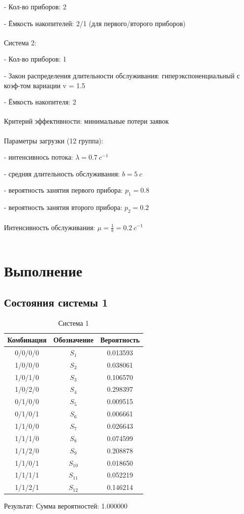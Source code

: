 \documentclass{article}
\begin{document}
- Кол-во приборов: 2

- Ёмкость накопителей: 2/1 (для первого/второго приборов)
\\ \\
Система 2: 

- Кол-во приборов: 1

- Закон распределения длительности обслуживания: гиперэкспоненциальный с коэф-том вариации v = 1.5

- Ёмкость накопителя: 2
\\ \\
Критерий эффективности: минимальные потери заявок
\\ \\
Параметры загрузки (12 группа):

- интенсивнось потока: $\lambda = 0.7 \ c^{-1}$

- средняя длительность обслуживания: $b = 5\ c$

- вероятность занятия первого прибора: $p_1 = 0.8$

- вероятность занятия второго прибора: $p_2 = 0.2$
\\ \\
Интенсивность обслуживания: $\mu = \frac{1}{b} = 0.2 \ c^{-1}$
\\ \\
\section{Выполнение}
\subsection*{Состояния системы 1}

\begin{table}[h]
    \centering
    \begin{tabular}{|c|c|c|}
    \hline
    Комбинация & Обозначение & Вероятность \\
    \hline
    0/0/0/0 & $S_1$ &  0.013593\\
    1/0/0/0 & $S_2$ &  0.038061\\
    1/0/1/0 & $S_3$ &  0.106570\\
    1/0/2/0 & $S_4$ &  0.298397\\
    0/1/0/0 & $S_5$ &  0.009515\\
    0/1/0/1 & $S_6$ &  0.006661\\
    1/1/0/0 & $S_7$ &  0.026643\\
    1/1/1/0 & $S_8$ &  0.074599\\
    1/1/2/0 & $S_9$ &  0.208878\\
    1/1/0/1 & $S_{10}$ &  0.018650\\
    1/1/1/1 & $S_{11}$ &  0.052219\\
    1/1/2/1 & $S_{12}$ &  0.146214\\
    \hline
    \end{tabular}
    \caption{Система 1}
    \label{tab:system1}
\end{table}
Результат: Сумма вероятностей: 1.000000
\end{document}
